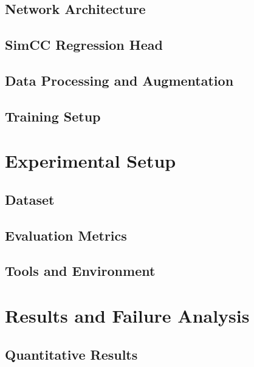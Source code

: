 \documentclass[a4paper,12pt]{article}
\begin{document}
\section{Network Architecture}

\section{SimCC Regression Head}

\section{Data Processing and Augmentation}

\section{Training Setup}

\chapter{Experimental Setup}
\section{Dataset}

\section{Evaluation Metrics}

\section{Tools and Environment}

\chapter{Results and Failure Analysis}
\section{Quantitative Results}
\end{document}
